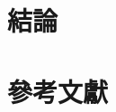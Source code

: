 \documentclass[12pt]{article}       %
\begin{document}
\section{\centering 結論} 
\hspace{2em}



\section{\centering 參考文獻}
\vspace{-3.5em}  %
\renewcommand{\refname}{}  %
\printbibliography  %
\end{document}
